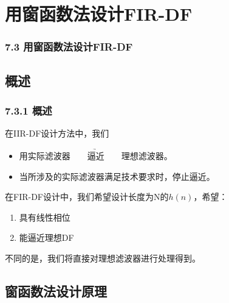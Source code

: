 \documentclass[notheorems,compress,mathserif,table]{beamer}
\begin{document}
%
\section{用窗函数法设计FIR-DF}
\begin{frame}\frametitle{7.3  用窗函数法设计FIR-DF}%

\end{frame}

\subsection{概述}

\begin{frame}\frametitle{7.3.1 概述}%
 在IIR-DF设计方法中，我们
   \begin{itemize}
       \item 用实际滤波器$\quad\underrightarrow{\quad\mbox{逼近}
                    \quad}\quad$理想滤波器。
       \item 当所涉及的实际滤波器满足技术要求时，停止逼近。
   \end{itemize}

   在FIR-DF设计中，我们希望设计长度为N的$h(n)$，希望：
      \begin{enumerate}
        \item 具有线性相位
        \item 能逼近理想DF
      \end{enumerate}
   不同的是，我们将直接对理想滤波器进行处理得到。
\end{frame}
\subsection{窗函数法设计原理}
\end{document}

